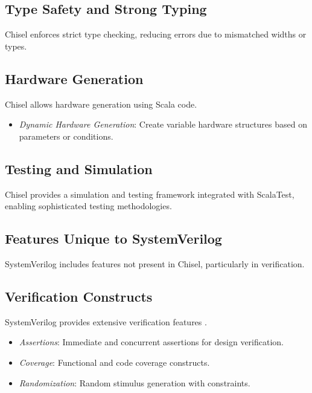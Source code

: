 \subsection{Type Safety and Strong Typing}

Chisel enforces strict type checking, reducing errors due to mismatched widths or types.

\subsection{Hardware Generation}

Chisel allows hardware generation using Scala code.

\begin{itemize}
    \item \textit{Dynamic Hardware Generation}: Create variable hardware structures based on parameters or conditions.
\end{itemize}

\subsection{Testing and Simulation}

Chisel provides a simulation and testing framework integrated with ScalaTest, enabling sophisticated testing methodologies.

\subsection{Features Unique to SystemVerilog}

SystemVerilog includes features not present in Chisel, particularly in verification.

\subsection{Verification Constructs}

SystemVerilog provides extensive verification features \cite{foster2003assertions}.

\begin{itemize}
    \item \textit{Assertions}: Immediate and concurrent assertions for design verification.
    \item \textit{Coverage}: Functional and code coverage constructs.
    \item \textit{Randomization}: Random stimulus generation with constraints.
\end{itemize}

